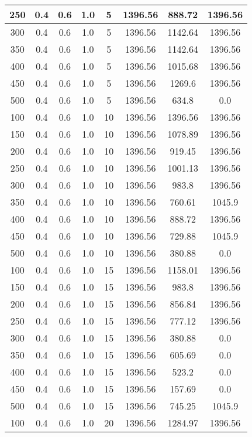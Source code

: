 \documentclass[a4paper, 12pt]{extreport}
\begin{document}
\begin{itemize}
\begin{longtable}{|c|c|c|c|c|c|c|c|}
			250 & 0.4 & 0.6 & 1.0 & 5 & 1396.56 & 888.72 & 1396.56 \\\hline
			300 & 0.4 & 0.6 & 1.0 & 5 & 1396.56 & 1142.64 & 1396.56 \\\hline
			350 & 0.4 & 0.6 & 1.0 & 5 & 1396.56 & 1142.64 & 1396.56 \\\hline
			400 & 0.4 & 0.6 & 1.0 & 5 & 1396.56 & 1015.68 & 1396.56 \\\hline
			450 & 0.4 & 0.6 & 1.0 & 5 & 1396.56 & 1269.6 & 1396.56 \\\hline
			500 & 0.4 & 0.6 & 1.0 & 5 & 1396.56 & 634.8 & 0.0 \\\hline
			100 & 0.4 & 0.6 & 1.0 & 10 & 1396.56 & 1396.56 & 1396.56 \\\hline
			150 & 0.4 & 0.6 & 1.0 & 10 & 1396.56 & 1078.89 & 1396.56 \\\hline
			200 & 0.4 & 0.6 & 1.0 & 10 & 1396.56 & 919.45 & 1396.56 \\\hline
			250 & 0.4 & 0.6 & 1.0 & 10 & 1396.56 & 1001.13 & 1396.56 \\\hline
			300 & 0.4 & 0.6 & 1.0 & 10 & 1396.56 & 983.8 & 1396.56 \\\hline
			350 & 0.4 & 0.6 & 1.0 & 10 & 1396.56 & 760.61 & 1045.9 \\\hline
			400 & 0.4 & 0.6 & 1.0 & 10 & 1396.56 & 888.72 & 1396.56 \\\hline
			450 & 0.4 & 0.6 & 1.0 & 10 & 1396.56 & 729.88 & 1045.9 \\\hline
			500 & 0.4 & 0.6 & 1.0 & 10 & 1396.56 & 380.88 & 0.0 \\\hline
			100 & 0.4 & 0.6 & 1.0 & 15 & 1396.56 & 1158.01 & 1396.56 \\\hline
			150 & 0.4 & 0.6 & 1.0 & 15 & 1396.56 & 983.8 & 1396.56 \\\hline
			200 & 0.4 & 0.6 & 1.0 & 15 & 1396.56 & 856.84 & 1396.56 \\\hline
			250 & 0.4 & 0.6 & 1.0 & 15 & 1396.56 & 777.12 & 1396.56 \\\hline
			300 & 0.4 & 0.6 & 1.0 & 15 & 1396.56 & 380.88 & 0.0 \\\hline
			350 & 0.4 & 0.6 & 1.0 & 15 & 1396.56 & 605.69 & 0.0 \\\hline
			400 & 0.4 & 0.6 & 1.0 & 15 & 1396.56 & 523.2 & 0.0 \\\hline
			450 & 0.4 & 0.6 & 1.0 & 15 & 1396.56 & 157.69 & 0.0 \\\hline
			500 & 0.4 & 0.6 & 1.0 & 15 & 1396.56 & 745.25 & 1045.9 \\\hline
			100 & 0.4 & 0.6 & 1.0 & 20 & 1396.56 & 1284.97 & 1396.56 \\\hline

\end{longtable}
\end{itemize}
\end{document}
